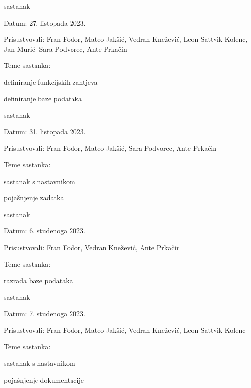 \begin{packed_enum}
			\item  sastanak
			\item[] \begin{packed_item}
				\item Datum: {27. listopada 2023.}
				\item Prisustvovali: {Fran Fodor, Mateo Jakšić, Vedran Knežević, Leon Sattvik Kolenc, Jan Murić, Sara Podvorec, Ante Prkačin}
				\item Teme sastanka:
				\begin{packed_item}
					\item  definiranje funkcijskih zahtjeva
					\item  definiranje baze podataka
				\end{packed_item}
			\end{packed_item}

			\item  sastanak
			\item[] \begin{packed_item}
				\item Datum: {31. listopada 2023.}
				\item Prisustvovali: {Fran Fodor, Mateo Jakšić, Sara Podvorec, Ante Prkačin}
				\item Teme sastanka:
				\begin{packed_item}
					\item  sastanak s nastavnikom
					\item  pojašnjenje zadatka
				\end{packed_item}
			\end{packed_item}

			\item  sastanak
			\item[] \begin{packed_item}
				\item Datum: {6. studenoga 2023.}
				\item Prisustvovali: {Fran Fodor, Vedran Knežević, Ante Prkačin}
				\item Teme sastanka:
				\begin{packed_item}
					\item  razrada baze podataka
				\end{packed_item}
			\end{packed_item}

			\item  sastanak
			\item[] \begin{packed_item}
				\item Datum: {7. studenoga 2023.}
				\item Prisustvovali: {Fran Fodor, Mateo Jakšić, Vedran Knežević, Leon Sattvik Kolenc}
				\item Teme sastanka:
				\begin{packed_item}
					\item  sastanak s nastavnikom
					\item  pojašnjenje dokumentacije
				\end{packed_item}
			\end{packed_item}


\end{packed_enum}
